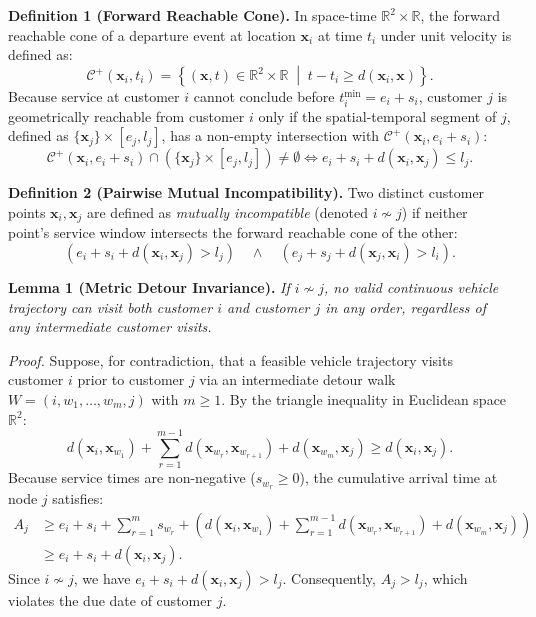 \documentclass[review]{elsarticle}
\begin{document}
\noindent\textbf{Definition 1 (Forward Reachable Cone).}
In space-time $\mathbb{R}^2 \times \mathbb{R}$, the forward reachable cone of a departure event at location $\mathbf{x}_i$ at time $t_i$ under unit velocity is defined as:
\begin{equation}
\mathcal{C}^+(\mathbf{x}_i, t_i) = \left\{ (\mathbf{x}, t) \in \mathbb{R}^2 \times \mathbb{R} \;\middle|\; t - t_i \ge d(\mathbf{x}_i, \mathbf{x}) \right\}.
\end{equation}
Because service at customer $i$ cannot conclude before $t_i^{\min} = e_i + s_i$, customer $j$ is geometrically reachable from customer $i$ only if the spatial-temporal segment of $j$, defined as $\{\mathbf{x}_j\} \times [e_j, l_j]$, has a non-empty intersection with $\mathcal{C}^+(\mathbf{x}_i, e_i + s_i)$:
\begin{equation}
\mathcal{C}^+(\mathbf{x}_i, e_i + s_i) \cap \left( \{\mathbf{x}_j\} \times [e_j, l_j] \right) \neq \emptyset \iff e_i + s_i + d(\mathbf{x}_i, \mathbf{x}_j) \le l_j.
\end{equation}

\noindent\textbf{Definition 2 (Pairwise Mutual Incompatibility).}
Two distinct customer points $\mathbf{x}_i, \mathbf{x}_j$ are defined as \textit{mutually incompatible} (denoted $i \nsim j$) if neither point's service window intersects the forward reachable cone of the other:
\begin{equation}
(e_i + s_i + d(\mathbf{x}_i, \mathbf{x}_j) > l_j) \quad \land \quad (e_j + s_j + d(\mathbf{x}_j, \mathbf{x}_i) > l_i).
\end{equation}

\vspace{0.25cm}
\noindent\textbf{Lemma 1 (Metric Detour Invariance).}
\textit{If $i \nsim j$, no valid continuous vehicle trajectory can visit both customer $i$ and customer $j$ in any order, regardless of any intermediate customer visits.}

\vspace{0.15cm}
\noindent\textit{Proof.}
Suppose, for contradiction, that a feasible vehicle trajectory visits customer $i$ prior to customer $j$ via an intermediate detour walk $W = (i, w_1, \dots, w_m, j)$ with $m \ge 1$. By the triangle inequality in Euclidean space $\mathbb{R}^2$:
\begin{equation}
d(\mathbf{x}_i, \mathbf{x}_{w_1}) + \sum_{r=1}^{m-1} d(\mathbf{x}_{w_r}, \mathbf{x}_{w_{r+1}}) + d(\mathbf{x}_{w_m}, \mathbf{x}_j) \ge d(\mathbf{x}_i, \mathbf{x}_j).
\end{equation}
Because service times are non-negative ($s_{w_r} \ge 0$), the cumulative arrival time at node $j$ satisfies:
\begin{align}
A_j &\ge e_i + s_i + \sum_{r=1}^m s_{w_r} + \left( d(\mathbf{x}_i, \mathbf{x}_{w_1}) + \sum_{r=1}^{m-1} d(\mathbf{x}_{w_r}, \mathbf{x}_{w_{r+1}}) + d(\mathbf{x}_{w_m}, \mathbf{x}_j) \right) \nonumber \\
    &\ge e_i + s_i + d(\mathbf{x}_i, \mathbf{x}_j).
\end{align}
Since $i \nsim j$, we have $e_i + s_i + d(\mathbf{x}_i, \mathbf{x}_j) > l_j$. Consequently, $A_j > l_j$, which violates the due date of customer $j$. 
\end{document}

